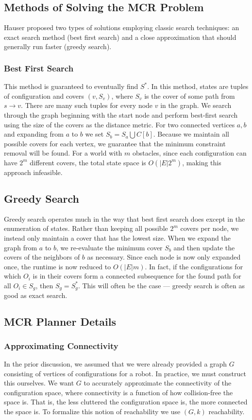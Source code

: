 \subsection{Methods of Solving the MCR Problem} \label{mcr:solving}
Hauser proposed two types of solutions employing classic search techniques: an exact search method (best first search) and a close approximation that should generally run faster (greedy search).

\subsubsection{Best First Search}
This method is guaranteed to eventually find $S^{*}$. In this method, states are tuples of configuration and covers $(v, S_v)$, where $S_v$ is the cover of some path from $s \rightarrow v$. There are many such tuples for every node $v$ in the graph. We search through the graph beginning with the start node and perform best-first search using the size of the covers as the distance metric. For two connected vertices $a, b$ and expanding from $a$ to $b$ we set $S_b = S_a \bigcup C[b]$. Because we maintain all possible covers for each vertex, we guarantee that the minimum constraint removal will be found. For a world with $m$ obstacles, since each configuration can have $2^m$ different covers, the total state space is $O(|E|2^m)$, making this approach infeasible.

\subsection{Greedy Search}
Greedy search operates much in the way that best first search does except in the enumeration of states. Rather than keeping all possible $2^m$ covers per node, we instead only maintain a cover that has the lowest size. When we expand the graph from $a$ to $b$, we re-evaluate the minimum cover $S_b$ and then update the covers of the neighbors of $b$ as necessary. Since each node is now only expanded once, the runtime is now reduced to $O(|E|m)$. In fact, if the configurations for which $O_i$ is in their covers form a connected subsequence for the found path for all $O_i \in S_g$, then $S_g = S^{*}_g$. This will often be the case --- greedy search is often as good as exact search.

\subsection{MCR Planner Details}
\subsubsection{Approximating Connectivity}
In the prior discussion, we assumed that we were already provided a graph $G$ consisting of vertices of configurations for a robot. In practice, we must construct this ourselves. We want $G$ to accurately approximate the connectivity of the configuration space, where connectivity is a function of how collision-free the space is. That is, the less cluttered the configuration space is, the more connected the space is. To formalize this notion of reachability we use $(G,k)$ reachability.

